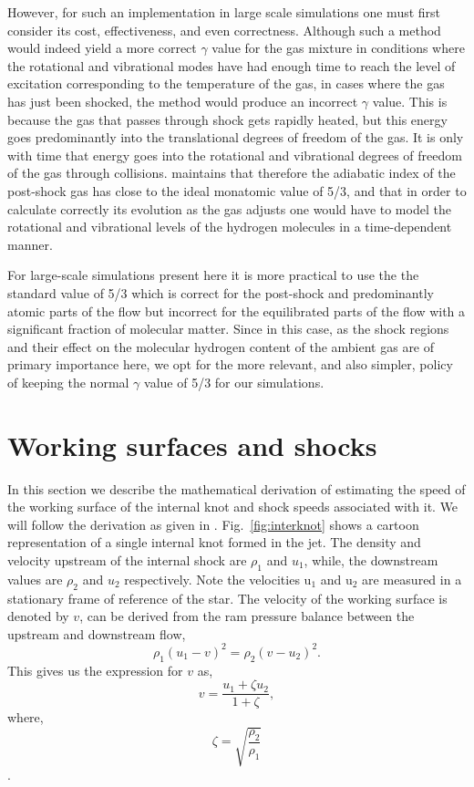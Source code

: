\documentclass[useAMS,usenatbib]{mn2e}
\begin{document}
However, for such an implementation in large scale simulations one must first
consider its cost, effectiveness, and even correctness. Although such
a method would indeed yield a more correct $\gamma$ value for the gas
mixture in conditions where the rotational and vibrational modes have
had enough time to reach the level of excitation corresponding to
the temperature of the gas, in cases where the gas has just been
shocked, the method would produce an incorrect $\gamma$ value. 
This is because the gas that passes through shock gets rapidly heated, 
but this energy goes predominantly into the translational degrees of
freedom of the gas. It is only with time that energy goes into the rotational and
vibrational degrees of freedom of the gas through collisions. 
\cite{Flower:2003p11236} maintains that therefore the adiabatic index of
the post-shock gas has close to the ideal monatomic value of 5/3, 
and that in order to calculate correctly its evolution as the gas 
adjusts one would have to model the rotational and vibrational 
levels of the hydrogen molecules in a time-dependent manner.
%

For large-scale simulations present here it is more practical to use
the the standard value of 5/3 which is correct for the post-shock 
and predominantly atomic parts of the flow but incorrect for the
equilibrated parts of the flow with a significant fraction of molecular matter.
Since in this case, as the shock regions and their effect on the molecular hydrogen content of 
the ambient gas are of primary importance here, we opt for the more
relevant, and also simpler, policy of keeping the normal $\gamma$
value of 5/3 for our simulations. 

\section{Working surfaces and shocks}
\label{sec:worksurface}
In this section we describe the mathematical derivation of estimating
the speed of the working surface of the internal knot and shock speeds
associated with it. We will follow the derivation as given in
\citep{Raga:1990p16416,Raga:1992p16392}. Fig.~\ref{fig:interknot} shows a cartoon
representation of a single internal knot formed in the jet. 
The density and velocity upstream of the internal shock are
$\rho_{1}$ and $u_{1}$, while, the downstream values are $\rho_{2}$
and $u_{2}$ respectively. Note the velocities u$_1$ and u$_2$ are measured
in a stationary frame of reference of the star. The velocity of the working surface is
denoted by $v$, can be derived from the ram pressure balance between the upstream and
downstream flow,
\begin{equation}
\rho_1 (u_1 - v)^{2} = \rho_2 (v - u_2)^{2}.
\label{eq:ramPbal}
\end{equation}
This gives us the expression for $v$ as, 
\begin{equation}
v = \frac{u_1 + \zeta u_2}{1 + \zeta},
\label{eq:velws}
\end{equation} 
where, $$\zeta = \sqrt{\frac{\rho_{2}}{\rho_1}}$$.
\end{document}
